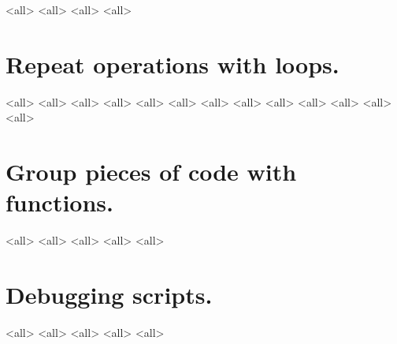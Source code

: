 \mode<all>{}
\mode<all>{}
\mode<all>{}
\mode<all>{}

\section{Repeat operations with loops.}
\mode<all>{}
\mode<all>{}
\mode<all>{}
\mode<all>{}
\mode<all>{}
\mode<all>{}
\mode<all>{}
\mode<all>{}
\mode<all>{}
\mode<all>{}
\mode<all>{}
\mode<all>{}
\mode<all>{}
%
\section{Group pieces of code with functions.}
\mode<all>{}
\mode<all>{}
\mode<all>{}
\mode<all>{}
\mode<all>{}

\section{Debugging scripts.}
\mode<all>{}
\mode<all>{}
\mode<all>{}
\mode<all>{}
\mode<all>{}


